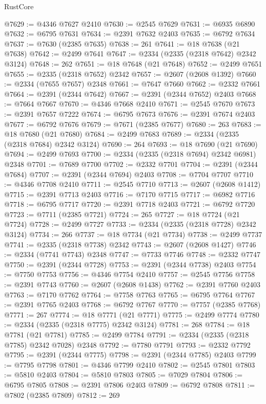 \begin{lexlean}{RustCore}
\begin{coremodule}
@7629 := @4346 @7627 @2410
@7630 := @2545 @7629
@7631 := @6935 @6890
@7632 := @6795 @7631
@7634 := @2391 @7632 @2403
@7635 := @6792 @7634
@7637 := @7630 (@2385 @7635)
@7638 := 261
@7641 := @18 @7638 (@21 @7638)
@7642 := @2499 @7641
@7647 := @2334 (@2335 (@2318 @7642) @2342 @3124)
@7648 := 262
@7651 := @18 @7648 (@21 @7648)
@7652 := @2499 @7651
@7655 := @2335 (@2318 @7652) @2342
@7657 := @2607 (@2608 @1392)
@7660 := @2334 (@7655 @7657) @2348
@7661 := @7647 @7660
@7662 := @2332 @7661
@7664 := @2391 (@2344 @7642)
@7667 := @2391 (@2344 @7652) @2403
@7668 := @7664 @7667
@7670 := @4346 @7668 @2410
@7671 := @2545 @7670
@7673 := @2391 @7657 @7222
@7674 := @6795 @7673
@7676 := @2391 @7674 @2403
@7677 := @6792 @7676
@7679 := @7671 (@2385 @7677)
@7680 := 263
@7683 := @18 @7680 (@21 @7680)
@7684 := @2499 @7683
@7689 := @2334 (@2335 (@2318 @7684) @2342 @3124)
@7690 := 264
@7693 := @18 @7690 (@21 @7690)
@7694 := @2499 @7693
@7700 := @2334 (@2335 (@2318 @7694) @2342 @6981) @2348
@7701 := @7689 @7700
@7702 := @2332 @7701
@7704 := @2391 (@2344 @7684)
@7707 := @2391 (@2344 @7694) @2403
@7708 := @7704 @7707
@7710 := @4346 @7708 @2410
@7711 := @2545 @7710
@7713 := @2607 (@2608 @1412)
@7715 := @2391 @7713 @2403
@7716 := @7170 @7715
@7717 := @6982 @7716
@7718 := @6795 @7717
@7720 := @2391 @7718 @2403
@7721 := @6792 @7720
@7723 := @7711 (@2385 @7721)
@7724 := 265
@7727 := @18 @7724 (@21 @7724)
@7728 := @2499 @7727
@7733 := @2334 (@2335 (@2318 @7728) @2342 @3124)
@7734 := 266
@7737 := @18 @7734 (@21 @7734)
@7738 := @2499 @7737
@7741 := @2335 (@2318 @7738) @2342
@7743 := @2607 (@2608 @1427)
@7746 := @2334 (@7741 @7743) @2348
@7747 := @7733 @7746
@7748 := @2332 @7747
@7750 := @2391 (@2344 @7728)
@7753 := @2391 (@2344 @7738) @2403
@7754 := @7750 @7753
@7756 := @4346 @7754 @2410
@7757 := @2545 @7756
@7758 := @2391 @7743
@7760 := @2607 (@2608 @1438)
@7762 := @2391 @7760 @2403
@7763 := @7170 @7762
@7764 := @7758 @7763
@7765 := @6795 @7764
@7767 := @2391 @7765 @2403
@7768 := @6792 @7767
@7770 := @7757 (@2385 @7768)
@7771 := 267
@7774 := @18 @7771 (@21 @7771)
@7775 := @2499 @7774
@7780 := @2334 (@2335 (@2318 @7775) @2342 @3124)
@7781 := 268
@7784 := @18 @7781 (@21 @7781)
@7785 := @2499 @7784
@7791 := @2334 (@2335 (@2318 @7785) @2342 @7028) @2348
@7792 := @7780 @7791
@7793 := @2332 @7792
@7795 := @2391 (@2344 @7775)
@7798 := @2391 (@2344 @7785) @2403
@7799 := @7795 @7798
@7801 := @4346 @7799 @2410
@7802 := @2545 @7801
@7803 := @5810 @2403
@7804 := @5810 @7803
@7805 := @7029 @7804
@7806 := @6795 @7805
@7808 := @2391 @7806 @2403
@7809 := @6792 @7808
@7811 := @7802 (@2385 @7809)
@7812 := 269

\end{coremodule}
\end{lexlean}
